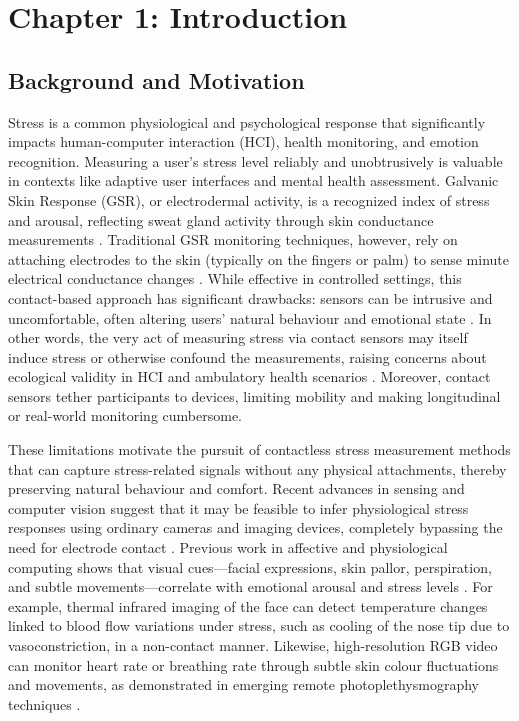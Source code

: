 \documentclass[11pt,a4paper]{report}
\begin{document}
\label{chap:1}
\chapter{Chapter 1: Introduction}

\section{Background and Motivation}

Stress is a common physiological and psychological response that significantly
impacts human-computer interaction (HCI), health monitoring, and emotion recognition.
Measuring a user's stress level reliably and unobtrusively is valuable in contexts
like adaptive user interfaces and mental health assessment.  Galvanic Skin Response
(GSR), or electrodermal activity, is a recognized index of stress and arousal,
reflecting sweat gland activity through skin conductance measurements
\cite{Boucsein2012}.  Traditional GSR monitoring techniques, however, rely on
attaching electrodes to the skin (typically on the fingers or palm) to sense minute
electrical conductance changes \cite{Fowles1981}.  While effective in controlled
settings, this contact-based approach has significant drawbacks: sensors can be
intrusive and uncomfortable, often altering users' natural behaviour and emotional
state \cite{Cacioppo2007}.  In other words, the very act of measuring stress via
contact sensors may itself induce stress or otherwise confound the measurements,
raising concerns about ecological validity in HCI and ambulatory health scenarios
\cite{Wilhelm2010}.  Moreover, contact sensors tether participants to devices,
limiting mobility and making longitudinal or real-world monitoring cumbersome.

These limitations motivate the pursuit of contactless stress measurement methods that
can capture stress-related signals without any physical attachments, thereby
preserving natural behaviour and comfort.  Recent advances in sensing and computer
vision suggest that it may be feasible to infer physiological stress responses using
ordinary cameras and imaging devices, completely bypassing the need for electrode
contact \cite{Picard2001}.  Previous work in affective and physiological computing
shows that visual cues—facial expressions, skin pallor, perspiration, and subtle
movements—correlate with emotional arousal and stress levels \cite{Healey2005}.  For
example, thermal infrared imaging of the face can detect temperature changes linked
to blood flow variations under stress, such as cooling of the nose tip due to
vasoconstriction, in a non-contact manner.  Likewise, high-resolution RGB video can
monitor heart rate or breathing rate through subtle skin colour fluctuations and
movements, as demonstrated in emerging remote photoplethysmography techniques
\cite{Poh2010}.
\end{document}
